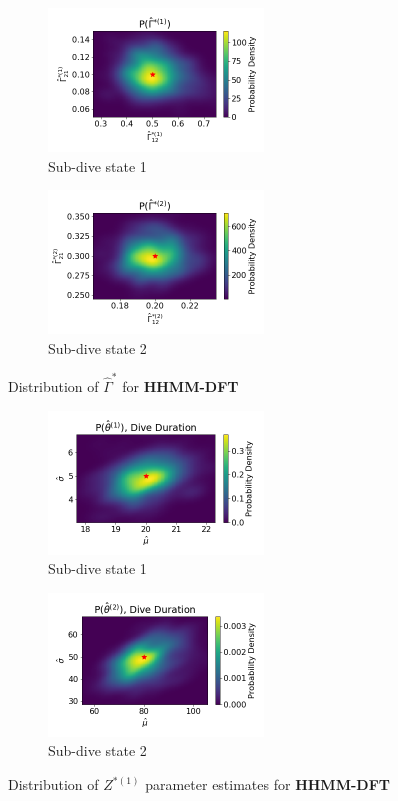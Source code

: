 \documentclass[12pt]{TD-CJS}
\begin{document}
\begin{figure}[ht]
	\centering
	\begin{subfigure}[t]{0.45\textwidth}
        \centering
        \includegraphics[width=2.25in]{../Plots/hhmm_FV_uncorr_Gamma_density_0.png}
        \caption{Sub-dive state 1}
    \end{subfigure}
    \begin{subfigure}[t]{0.45\textwidth}
        \centering
        \includegraphics[width=2.25in]{../Plots/hhmm_FV_uncorr_Gamma_density_1.png}
        \caption{Sub-dive state 2}
    \end{subfigure}
    \caption{Distribution of $\hat \Gamma^{*}$ for \textbf{HHMM-DFT}}
\end{figure}

\begin{figure}[ht]
	\centering
	\begin{subfigure}[t]{0.45\textwidth}
        \centering
        \includegraphics[width=2.25in]{../Plots/hhmm_FV_uncorr_MLE_density_dive_duration_-1_0.png}
        \caption{Sub-dive state 1}
    \end{subfigure}
    \begin{subfigure}[t]{0.45\textwidth}
        \centering
        \includegraphics[width=2.25in]{../Plots/hhmm_FV_uncorr_MLE_density_dive_duration_-1_1.png}
        \caption{Sub-dive state 2}
    \end{subfigure}
    \caption{Distribution of $Z^{*(1)}$ parameter estimates for \textbf{HHMM-DFT}}
\end{figure}
\end{document}

